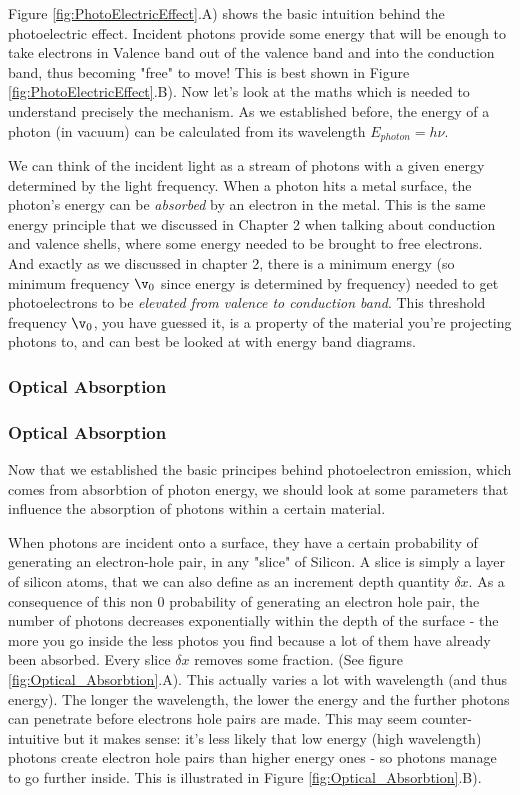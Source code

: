 Figure \ref{fig:PhotoElectricEffect}.A) shows the basic intuition behind the photoelectric effect. Incident photons provide some energy that will be enough to take electrons in Valence band out of the valence band and into the conduction band, thus becoming "free" to move! This is best shown in Figure \ref{fig:PhotoElectricEffect}.B). Now let's look at the maths which is needed to understand precisely the mechanism. As we established before, the energy of a photon (in vacuum) can be calculated from its wavelength $E_{photon} = h \nu$. 

We can think of the incident light as a stream of photons with a given energy determined by the light frequency. When a photon hits a metal surface, the photon's energy can be \textit{absorbed} by an electron in the metal. This is the same energy principle that we discussed in Chapter 2 when talking about conduction and valence shells, where some energy needed to be brought to free electrons. And exactly as we discussed in chapter 2, there is a minimum energy (so minimum frequency $\v_0$ since energy is determined by frequency) needed to get photoelectrons to be \textit{elevated from valence to conduction band}.  This threshold frequency $\v_0$, you have guessed it, is a property of the material you're projecting photons to, and can best be looked at with energy band diagrams. 

\subsubsection{Optical Absorption}
\subsubsection{Optical Absorption}


Now that we established the basic principes behind photoelectron emission, which comes from absorbtion of photon energy, we should look at some parameters that influence the absorption of photons within a certain material.

When photons are incident onto a surface, they have a certain probability of generating an electron-hole pair, in any "slice" of Silicon. A slice is simply a layer of silicon atoms, that we can also define as an increment depth quantity $\delta x$. As a consequence of this non 0 probability of generating an electron hole pair, the number of photons decreases exponentially within the depth of the surface - the more you go inside the less photos you find because a lot of them have already been absorbed. Every slice $\delta x$ removes some fraction. (See figure \ref{fig:Optical_Absorbtion}.A). This actually varies a lot with wavelength (and thus energy). The longer the wavelength, the lower the energy and the further photons can penetrate before electrons hole pairs are made. This may seem counter-intuitive but it makes sense: it's less likely that low energy (high wavelength) photons create electron hole pairs than higher energy ones - so photons manage to go further inside. This is illustrated in Figure \ref{fig:Optical_Absorbtion}.B). 

